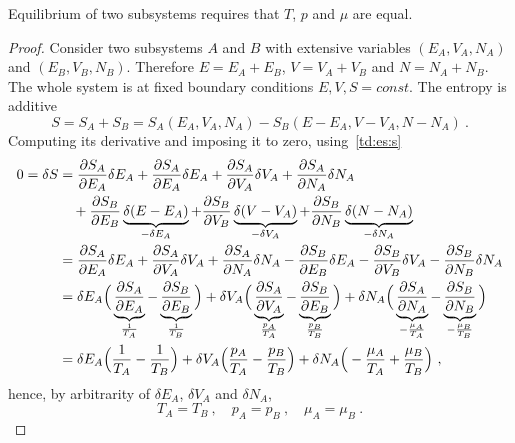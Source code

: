     Equilibrium of two subsystems requires that $T$, $p$ and $\mu$ are equal.
    \begin{proof}
        Consider two subsystems $A$ and $B$ with extensive variables $(E_A, V_A, N_A)$ and $(E_B, V_B, N_B)$. Therefore $E = E_A + E_B$, $V = V_A + V_B$ and $N = N_A + N_B$. The whole system is at fixed boundary conditions $E, V, S = const$. The entropy is additive 
        \begin{equation*}
            S = S_A + S_B = S_A(E_A, V_A, N_A) - S_B(E - E_A, V-V_A, N-N_A) ~.
        \end{equation*}
        Computing its derivative and imposing it to zero, using~\eqref{td:es:s}
        \begin{equation*}
        \begin{aligned}
            0 = \delta S & = \frac{\partial S_A}{\partial E_A} \delta E_A + \frac{\partial S_A}{\partial E_A} \delta E_A + \frac{\partial S_A}{\partial V_A} \delta V_A + \frac{\partial S_A}{\partial N_A} \delta N_A \\ & \quad + \frac{\partial S_B}{\partial E_B} \underbrace{\delta (E - E_A)}_{- \delta E_A} + \frac{\partial S_B}{\partial V_B} \underbrace{\delta (V - V_A)}_{- \delta V_A} + \frac{\partial S_B}{\partial N_B} \underbrace{\delta (N - N_A)}_{- \delta N_A} \\ & = \frac{\partial S_A}{\partial E_A} \delta E_A + \frac{\partial S_A}{\partial V_A} \delta V_A + \frac{\partial S_A}{\partial N_A} \delta N_A - \frac{\partial S_B}{\partial E_B} \delta E_A - \frac{\partial S_B}{\partial V_B}  \delta V_A - \frac{\partial S_B}{\partial N_B} \delta N_A  \\ & = \delta E_A \Big ( \underbrace{\frac{\partial S_A}{\partial E_A}}_{\frac{1}{T_A}} - \underbrace{\frac{\partial S_B}{\partial E_B}}_{\frac{1}{T_B}} \Big) + \delta V_A \Big ( \underbrace{\frac{\partial S_A}{\partial V_A}}_{\frac{p_A}{T_A}} - \underbrace{\frac{\partial S_B}{\partial E_B}}_{\frac{p_B}{T_B}} \Big) + \delta N_A \Big (\underbrace{\frac{\partial S_A}{\partial N_A}}_{ - \frac{\mu_A}{T_A}} - \underbrace{\frac{\partial S_B}{\partial N_B}}_{- \frac{\mu_B}{T_B}} \Big) \\ & = \delta E_A \Big ( \frac{1}{T_A} - \frac{1}{T_B} \Big) + \delta V_A \Big ( \frac{p_A}{T_A} - \frac{p_B}{T_B} \Big) + \delta N_A \Big (- \frac{\mu_A}{T_A} + \frac{\mu_B}{T_B} \Big) ~,
        \end{aligned}
        \end{equation*}
        hence, by arbitrarity of $\delta E_A$, $\delta V_A$ and $\delta N_A$,
        \begin{equation*}
            T_A = T_B ~, \quad p_A = p_B ~, \quad \mu_A = \mu_B ~.
        \end{equation*}
    \end{proof}

